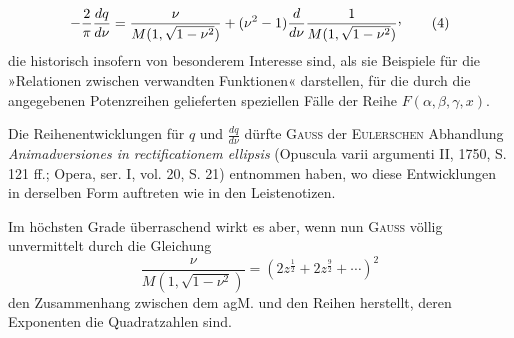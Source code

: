 \begin{equation*}
-\frac2\pi\frac{dq}{d\nu}=\frac\nu{M(1,\sqrt{1-\nu^2})}+(\nu^2-1)\frac d{d\nu}\frac1{M(1,\sqrt{1-\nu^2})}\mathpunct{\vcenter{\hbox{,}}}\tag*{(4)}
\end{equation*}
\endgroup
\noindent die historisch insofern von besonderem Interesse sind, als sie Beispiele für
die »Relationen zwischen verwandten Funktionen« darstellen, für die durch
die angegebenen Potenzreihen gelieferten speziellen Fälle der Reihe \(F(\alpha,\beta,\gamma,x)\).

Die Reihenentwicklungen für \(q\) und \(\frac{dq}{d\nu}\) dürfte \textsc{Gauss} der \textsc{Eulerschen}
Abhandlung \textit{Animadversiones in rectificationem ellipsis} (Opuscula varii argumenti
II, 1750, S. 121 ff.; Opera, ser. I, vol. 20, S. 21) entnommen haben, wo diese
Entwicklungen in derselben Form auftreten wie in den Leistenotizen.\par
\clearpage{}
\indent Im höchsten Grade überraschend wirkt es aber, wenn nun \textsc{Gauss} völlig
unvermittelt durch die Gleichung
\begingroup\makeatletter\tagsleft@true\let\veqno\leqno\makeatother
\begin{equation*}
\frac\nu{M(1,\sqrt{1-\nu^2})}=\left(2z^{\frac12}+2z^{\frac92}+\cdots\right)^2\tag*{(5)}
\end{equation*}
\noindent den Zusammenhang zwischen dem agM. und den Reihen herstellt, deren Exponenten
die Quadratzahlen sind.

